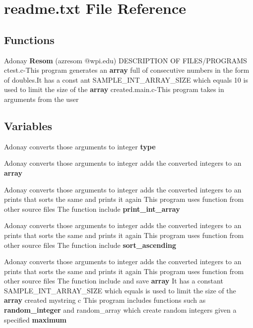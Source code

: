 \section{readme.\+txt File Reference}
\label{readme_8txt}
\subsection*{Functions}
\begin{DoxyCompactItemize}
\item 
Adonay {\bf Resom} (azresom @wpi.\+edu) D\+E\+S\+C\+R\+I\+P\+T\+I\+ON OF F\+I\+L\+ES/P\+R\+O\+G\+R\+A\+MS ctest.\+c-\/This program generates an {\bf array} full of consecutive numbers in the form of doubles.\+It has a const ant S\+A\+M\+P\+L\+E\+\_\+\+I\+N\+T\+\_\+\+A\+R\+R\+A\+Y\+\_\+\+S\+I\+ZE which equals 10 is used to limit the size of the {\bf array} created.\+main.\+c-\/This program takes in arguments from the user
\end{DoxyCompactItemize}
\subsection*{Variables}
\begin{DoxyCompactItemize}
\item 
Adonay converts those arguments to integer {\bf type}
\item 
Adonay converts those arguments to integer adds the converted integers to an {\bf array}
\item 
Adonay converts those arguments to integer adds the converted integers to an prints that sorts the same and prints it again This program uses function from other source files The function include {\bf print\+\_\+int\+\_\+array}
\item 
Adonay converts those arguments to integer adds the converted integers to an prints that sorts the same and prints it again This program uses function from other source files The function include {\bf sort\+\_\+ascending}
\item 
Adonay converts those arguments to integer adds the converted integers to an prints that sorts the same and prints it again This program uses function from other source files The function include and save {\bf array} It has a constant S\+A\+M\+P\+L\+E\+\_\+\+I\+N\+T\+\_\+\+A\+R\+R\+A\+Y\+\_\+\+S\+I\+ZE which equals is used to limit the size of the {\bf array} created mystring c This program includes functions such as {\bf random\+\_\+integer} and random\+\_\+array which create random integers given a specified {\bf maximum}
\end{DoxyCompactItemize}


